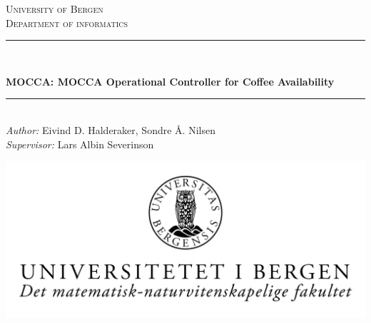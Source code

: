 \begin{titlepage}

\newcommand{\HRule}{\rule{\linewidth}{0.5mm}} %

\center %
 

\textsc{\LARGE University of Bergen \\ Department of informatics}\\[1.5cm] %


\HRule \\[0.5cm]
\begin{Huge}
	\bfseries{MOCCA: MOCCA Operational Controller for Coffee 
Availability}\\[0.7cm] %
\end{Huge}
\HRule \\[0.5cm]


\large \emph{Author:} Eivind D. Halderaker, Sondre Å. Nilsen\\
\large \emph{Supervisor:} Lars Albin Severinson\\[2cm]


\centerline{\includegraphics[scale=1.9]{figures/canvasWithFaculty}}


\end{titlepage}
